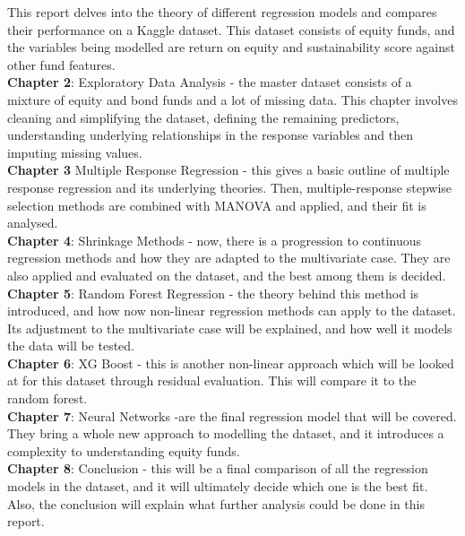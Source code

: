 This report delves into the theory of different regression models and compares their performance on a Kaggle dataset. This dataset consists of equity funds, and the variables being modelled are return on equity and sustainability score against other fund features.
\\
\newline
\textbf{Chapter 2}: Exploratory Data Analysis - the master dataset consists of a mixture of equity and bond funds and a lot of missing data. This chapter involves cleaning and simplifying the dataset, defining the remaining predictors, understanding underlying relationships in the response variables and then imputing missing values.
\\
\newline
\textbf{Chapter 3} Multiple Response Regression - this gives a basic outline of multiple response regression and its underlying theories. Then, multiple-response stepwise selection methods are combined with MANOVA and applied, and their fit is analysed.
\\
\newline
\textbf{Chapter 4}: Shrinkage Methods - now, there is a progression to continuous regression methods and how they are adapted to the multivariate case. They are also applied and evaluated on the dataset, and the best among them is decided.
\\
\newline
\textbf{Chapter 5}: Random Forest Regression - the theory behind this method is introduced, and how now non-linear regression methods can apply to the dataset. Its adjustment to the multivariate case will be explained, and how well it models the data will be tested.
\\
\newline
\textbf{Chapter 6}: XG Boost - this is another non-linear approach which will be looked at for this dataset through residual evaluation. This will compare it to the random forest.
\\
\newline
\textbf{Chapter 7}: Neural Networks -are the final regression model that will be covered. They bring a whole new approach to modelling the dataset, and it introduces a complexity to understanding equity funds.
\\
\newline
\textbf{Chapter 8}: Conclusion - this will be a final comparison of all the regression models in the dataset, and it will ultimately decide which one is the best fit. Also, the conclusion will explain what further analysis could be done in this report.


